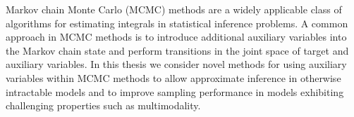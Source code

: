 









Markov chain Monte Carlo (MCMC) methods are a widely applicable class of algorithms for estimating integrals in statistical inference problems. A common approach in MCMC methods is to introduce additional auxiliary variables into the Markov chain state and perform transitions in the joint space of target and auxiliary variables. In this thesis we consider novel methods for using auxiliary variables within MCMC methods to allow approximate inference in otherwise intractable models and to improve sampling performance in models exhibiting challenging properties such as multimodality.

